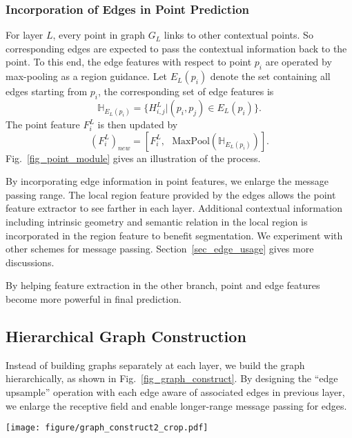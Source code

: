 \documentclass[10pt,twocolumn,letterpaper]{article}
\begin{document}
\subsubsection{Incorporation of Edges in Point Prediction}
\label{sec_interaction}
For layer $L$, every point in graph $G_L$ links to other contextual points. So corresponding edges are expected to pass the contextual information back to the point. To this end, the edge features with respect to point $p_i$ are operated by max-pooling as a region guidance. Let $E_L(p_i)$ denote the set containing all edges starting from $p_i$, the corresponding set of edge features is
\begin{equation}
\mathbb{H}_{E_L(p_i)} = \{H_{i, j}^{L} | (p_i, p_j) \in E_L(p_i)\}.
\end{equation}
The point feature $F_i^{L}$ is then updated by
\begin{equation}
(F_i^{L})_{new} = [F_i^{L}, \text{ } \mbox{MaxPool}(\mathbb{H}_{E_L(p_i)} )].
\end{equation}
Fig.~\ref{fig_point_module} gives an illustration of the process. 

By incorporating edge information in point features, we enlarge the message passing range. The local region feature provided by the edges allows the point feature extractor to see farther in each layer.
Additional contextual information including intrinsic geometry and semantic relation in the local region is incorporated in the region feature to benefit segmentation.
We experiment with other schemes for message passing. Section~\ref{sec_edge_usage} gives more discussions.

By helping feature extraction in the other branch, point and edge features become more powerful in final prediction.

\subsection{Hierarchical Graph Construction}
\label{sec_hierarchical_graph}
Instead of building graphs separately at each layer, we build the graph hierarchically, as shown in Fig.~\ref{fig_graph_construct}. By designing the ``edge upsample'' operation with each edge aware of associated edges in previous layer, we enlarge the receptive field and enable longer-range message passing for edges.


\begin{figure*}
	\begin{center}
		\texttt{[image: figure/graph\_construct2\_crop.pdf]}
	\end{center}
	\vspace{-1mm}
	\caption{Hierarchical Graph Construction. The graph is initialized in the coarsest layer and is progressively enlarged by considering both point coordinates in the current layer and the graph in previous layer.}
	\label{fig_graph_construct}
\end{figure*}
\end{document}

